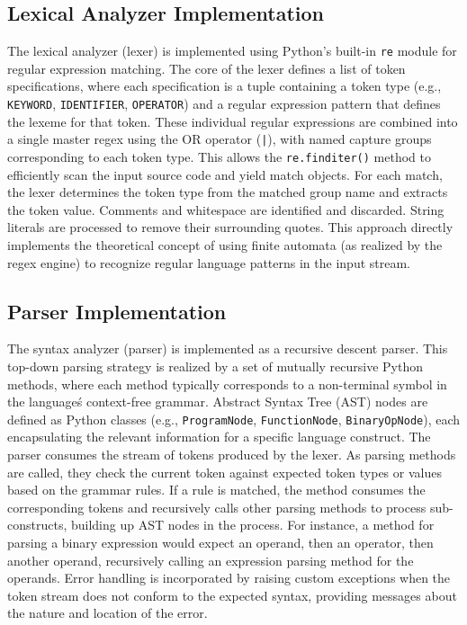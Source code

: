 \documentclass[12pt, letterpaper]{article}
\begin{document}
\subsection*{Lexical Analyzer Implementation}

The lexical analyzer (lexer) is implemented using Python's built-in \texttt{re} module for regular expression matching.\@
The core of the lexer defines a list of token specifications, where each specification is a tuple containing a token type (e.g., \texttt{KEYWORD}, \texttt{IDENTIFIER}, \texttt{OPERATOR}) and a regular expression pattern that defines the lexeme for that token.\@
These individual regular expressions are combined into a single master regex using the OR operator (\texttt{|}), with named capture groups corresponding to each token type. This allows the \texttt{re.finditer()} method to efficiently scan the input source code and yield match objects.\@
For each match, the lexer determines the token type from the matched group name and extracts the token value. Comments and whitespace are identified and discarded. String literals are processed to remove their surrounding quotes. This approach directly implements the theoretical concept of using finite automata (as realized by the regex engine) to recognize regular language patterns in the input stream.

\subsection*{Parser Implementation}

The syntax analyzer (parser) is implemented as a recursive descent parser. This top-down parsing strategy is realized by a set of mutually recursive Python methods, where each method typically corresponds to a non-terminal symbol in the language\'s context-free grammar.\@
Abstract Syntax Tree (AST) nodes are defined as Python classes (e.g., \texttt{ProgramNode}, \texttt{FunctionNode}, \texttt{BinaryOpNode}), each encapsulating the relevant information for a specific language construct.\@
The parser consumes the stream of tokens produced by the lexer. As parsing methods are called, they check the current token against expected token types or values based on the grammar rules. If a rule is matched, the method consumes the corresponding tokens and recursively calls other parsing methods to process sub-constructs, building up AST nodes in the process. For instance, a method for parsing a binary expression would expect an operand, then an operator, then another operand, recursively calling an expression parsing method for the operands.\@
Error handling is incorporated by raising custom exceptions when the token stream does not conform to the expected syntax, providing messages about the nature and location of the error.
\end{document}
